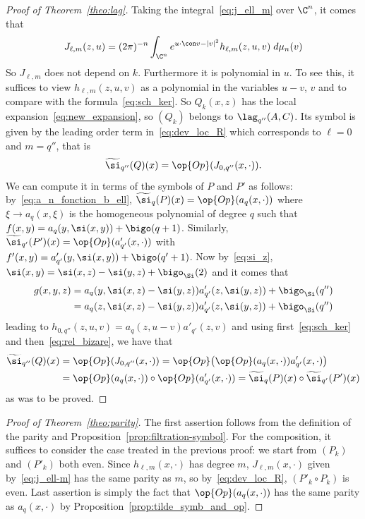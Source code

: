 \begin{proof}[Proof of Theorem~\ref{theo:lag}]
Taking the integral~\eqref{eq:j_ell_m} over $\C^n$, it comes that
\begin{gather}\label{eq:j_ell-m}
J_{\ell,m} (z,u) = (2 \pi)^{-n} \int_{\C^n} e^{u \cdot \con v - | v| ^2 } h_{\ell, m } (z, u, v) \; d\mu_n (v)
\end{gather}
So $J_{\ell,m}$ does not depend on $k$. Furthermore it is polynomial in $u$. To see this, it suffices to view $h_{\ell, m } (z,u, v)$ as a polynomial in the variables $u-v$, $v$ and to compare with the formula~\eqref{eq:sch_ker}. So $Q_k (x,z)$ has the local expansion~\eqref{eq:new_expansion}, so $(Q_k)$ belongs to $\lag _{q''} (A, C)$. Its symbol is given by the leading order term in~\eqref{eq:dev_loc_R} which corresponds to $\ell =0$ and $m = q''$, that is
\[
\widetilde{\si}_{q''} (Q) (x) = \op{Op} (J_{0, q''} (x,
\cdot)).
\]
We can compute it in terms of the symbols of $P$ and $P'$ as follows: by~\eqref{eq:a_n_fonction_b_ell}, $\widetilde \si_{q} (P)(x) = \op{Op} (a_q(x, \cdot))$ where $\xi \rightarrow a_q(x,\xi)$ is the homogeneous polynomial of degree $q$ such that $f(x,y) = a_q (y, \si (x,y)) + \bigo (q+1)$. Similarly, $\widetilde \si_{q'} (P')(x) = \op{Op} (a'_{q'}(x, \cdot))$ with $f'(x,y) = a'_{q'} (y, \si (x,y)) + \bigo (q'+1)$. Now by~\eqref{eq:si_z}, $\si (x,y) = \si (x,z) - \si (y,z) + \bigo _{\Si} (2)$ and it comes that
\begin{align*}
g(x,y,z) & = a_q (y, \si (x,z) - \si (y,z)) a'_{q'} (z, \si (y,z)) +
\bigo_{\Si} (q'') \\
& = a_q (z, \si (x,z) - \si (y,z)) a'_{q'} (z, \si (y,z)) +
\bigo_{\Si} (q'')
\end{align*}
leading to $ h_{0, q''} (z, u,v) = a_q (z, u - v) a'_{q'} (z,v) $ and using first~\eqref{eq:sch_ker} and then~\eqref{eq:rel_bizare}, we have that
\begin{align*}
\widetilde{\si}_{q''} (Q)(x) & = \op{Op} (J_{0, q''} (x,
\cdot)) = \op{Op} \bigl(\op{Op} (a_q (x,\cdot)) a'_{q'} (x,\cdot) \bigr) \\
& = \op{Op} (a_q (x,\cdot)) \circ \op{Op} (a'_{q'} (x,\cdot)) = \widetilde \si_{q} (P) (x)
\circ \widetilde \si_{q'} (P')(x)
\end{align*}
as was to be proved.
\end{proof}

\begin{proof}[Proof of Theorem~\ref{theo:parity}]
The first assertion follows from the definition of the parity and Proposition~\ref{prop:filtration-symbol}. For the composition, it suffices to consider the case treated in the previous proof: we start from $(P_k)$ and $(P'_k)$ both even. Since $h_{\ell,m}(x,\cdot) $ has degree $m$, $J_{\ell,m}(x, \cdot)$ given by~\eqref{eq:j_ell-m} has the same parity as $m$, so by~\eqref{eq:dev_loc_R}, $(P'_k \circ P_k)$ is even. Last assertion is simply the fact that $\op{Op} (a_q(x,\cdot))$ has the same parity as $a_q (x,\cdot)$ by Proposition~\ref{prop:tilde_symb_and_op}.
\end{proof}

